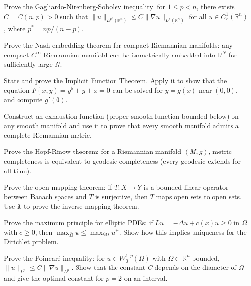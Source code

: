 \documentclass[12pt,a4paper]{exam}
\begin{document}
\begin{questions}
\vspace{0.3cm}

\question[5]
Prove the Gagliardo-Nirenberg-Sobolev inequality: for $1 \leq p < n$, there exists $C = C(n,p) > 0$ such that $\|u\|_{L^{p^*}(\mathbb{R}^n)} \leq C \|\nabla u\|_{L^p(\mathbb{R}^n)}$ for all $u \in C_c^1(\mathbb{R}^n)$, where $p^* = np/(n-p)$.

\vspace{0.3cm}

\question[4]
Prove the Nash embedding theorem for compact Riemannian manifolds: any compact $C^\infty$ Riemannian manifold can be isometrically embedded into $\mathbb{R}^N$ for sufficiently large $N$.

\vspace{0.3cm}

\question[2]
State and prove the Implicit Function Theorem. Apply it to show that the equation $F(x,y) = y^5 + y + x = 0$ can be solved for $y = g(x)$ near $(0,0)$, and compute $g'(0)$.

\vspace{0.3cm}

\question[5]
Construct an exhaustion function (proper smooth function bounded below) on any smooth manifold and use it to prove that every smooth manifold admits a complete Riemannian metric.

\vspace{0.3cm}

\question[2]
Prove the Hopf-Rinow theorem: for a Riemannian manifold $(M,g)$, metric completeness is equivalent to geodesic completeness (every geodesic extends for all time).

\vspace{0.3cm}

\question[4]
Prove the open mapping theorem: if $T: X \to Y$ is a bounded linear operator between Banach spaces and $T$ is surjective, then $T$ maps open sets to open sets. Use it to prove the inverse mapping theorem.

\vspace{0.3cm}

\question[5]
Prove the maximum principle for elliptic PDEs: if $Lu = -\Delta u + c(x) u \geq 0$ in $\Omega$ with $c \geq 0$, then $\max_{\overline{\Omega}} u \leq \max_{\partial\Omega} u^+$. Show how this implies uniqueness for the Dirichlet problem.

\vspace{0.3cm}

\question[3]
Prove the Poincar\'e inequality: for $u \in W_0^{1,p}(\Omega)$ with $\Omega \subset \mathbb{R}^n$ bounded, $\|u\|_{L^p} \leq C \|\nabla u\|_{L^p}$. Show that the constant $C$ depends on the diameter of $\Omega$ and give the optimal constant for $p=2$ on an interval.


\end{questions}
\end{document}
